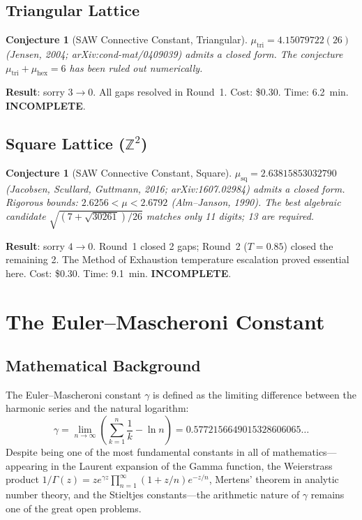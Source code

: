 \documentclass[12pt,a4paper]{report}
\theoremstyle{plain}
\newtheorem{conjecture}[theorem]{Conjecture}
\theoremstyle{definition}
\theoremstyle{remark}
\newcommand{\verdict}[1]{\textbf{\textcolor{inkblue}{#1}}}
\newcommand{\Z}{\mathbb{Z}}
\begin{document}
\section{Triangular Lattice}

\begin{conjecture}[SAW Connective Constant, Triangular]
$\mu_{\text{tri}} = 4.15079722(26)$ (Jensen, 2004; arXiv:cond-mat/0409039) admits a
closed form. The conjecture $\mu_{\text{tri}} + \mu_{\text{hex}} = 6$ has been ruled
out numerically.
\end{conjecture}

\noindent\textbf{Result}: sorry $3 \to 0$. All gaps resolved in Round~1. Cost: \$0.30.
Time: 6.2~min. \verdict{INCOMPLETE}.

\section{Square Lattice ($\Z^2$)}

\begin{conjecture}[SAW Connective Constant, Square]
$\mu_{\text{sq}} = 2.63815853032790$ (Jacobsen, Scullard, Guttmann, 2016;
arXiv:1607.02984) admits a closed form. Rigorous bounds: $2.6256 < \mu < 2.6792$
(Alm--Janson, 1990). The best algebraic candidate
$\sqrt{(7+\sqrt{30261})/26}$ matches only 11 digits; 13 are required.
\end{conjecture}

\noindent\textbf{Result}: sorry $4 \to 0$. Round~1 closed 2 gaps; Round~2 ($T=0.85$)
closed the remaining 2. The Method of Exhaustion temperature escalation proved essential
here. Cost: \$0.30. Time: 9.1~min. \verdict{INCOMPLETE}.

\chapter{The Euler--Mascheroni Constant}
\label{ch:euler}

\section{Mathematical Background}

The Euler--Mascheroni constant $\gamma$ is defined as the limiting difference between
the harmonic series and the natural logarithm:
\[
  \gamma = \lim_{n \to \infty} \left( \sum_{k=1}^n \frac{1}{k} - \ln n \right)
  = 0.5772156649015328606065\ldots
\]
Despite being one of the most fundamental constants in all of mathematics—appearing in
the Laurent expansion of the Gamma function, the Weierstrass product
$1/\Gamma(z) = z e^{\gamma z} \prod_{n=1}^\infty (1 + z/n) e^{-z/n}$,
Mertens' theorem in analytic number theory, and the Stieltjes constants—the
arithmetic nature of $\gamma$ remains one of the great open problems.
\end{document}
